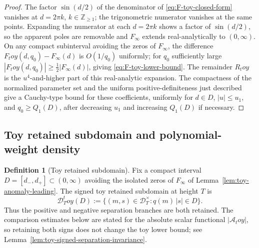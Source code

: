 \documentclass[11pt,a4paper]{amsart}
\def\toy{toy}%
\numberwithin{equation}{section}
\theoremstyle{plain}
\theoremstyle{definition}
\newtheorem{definition}[theorem]{Definition}
\newcommand{\toy}{\mathrm{toy}}
\begin{document}
\begin{proof}
The factor \(\sin(d/2)\) of the denominator of
\eqref{eq:F-toy-closed-form} vanishes at \(d=2\pi k\),
\(k\in\mathbb Z_{\ge 1}\); the trigonometric numerator vanishes at
the same points.  Expanding the numerator at each \(d=2\pi k\) shows a
factor of \(\sin(d/2)\), so the apparent poles are removable and
\(F_{\infty}\) extends real-analytically to \((0,\infty)\).  On any compact subinterval avoiding the zeros of
\(F_{\infty}\), the difference \(F_\toy(d,q_0)-F_{\infty}(d)\) is
\(O(1/q_0)\) uniformly; for \(q_0\) sufficiently large
\(|F_\toy(d,q_0)|\ge \tfrac12|F_{\infty}(d)|\), giving
\eqref{eq:F-toy-lower-bound}.  The remainder \(R_\toy\) is the \(u^4\)-and-higher part of this
real-analytic expansion.  The compactness of the normalized parameter
set and the uniform positive-definiteness just described give a
Cauchy-type bound for these coefficients, uniformly for \(d\in D\),
\(|u|\le u_1\), and \(q_0\ge Q_1(D)\), after decreasing \(u_1\) and
increasing \(Q_1(D)\) if necessary.
\end{proof}

\subsection{Toy retained subdomain and polynomial-weight density}
\label{subsec:toy-retained-subdomain}

\begin{definition}[Toy retained subdomain]
\label{def:toy-retained-subdomain}
Fix a compact interval \(D=[d_-,d_+]\subset(0,\infty)\) avoiding the
isolated zeros of \(F_{\infty}\) of
Lemma~\ref{lem:toy-anomaly-leading}.  The signed toy retained subdomain
at height \(T\) is
\begin{equation}
\label{eq:toy-retained-subdomain}
        \mathcal D_T^\toy(D)
        :=\bigl\{(m,s)\in\mathcal D_T^\times:
              q(m)\,|s|\in D\bigr\}.
\end{equation}
Thus the positive and negative separation branches are both retained.
The comparison estimates below are stated for the absolute scalar
functional \(|\mathcal A_\toy|\), so retaining both signs does not change
the toy lower bound; see Lemma~\ref{lem:toy-signed-separation-invariance}.
\end{definition}
\end{document}

